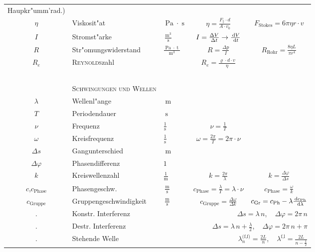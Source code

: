 \begin{landscape}
\begin{longtable}{c l l c c}
{  Haupkr"umm'rad.)}\\
%
$\eta$ & Viskosit"at & $\operatorname{Pa}\cdot\operatorname{s}$ & $\eta
= \frac{F_\| \cdot d}{A \cdot v_0}$ & $F_\text{Stokes} = 6\pi \eta
r \cdot v$\\
$I$ & Stromst"arke & $\frac{\operatorname{m}^3}{\operatorname{s}}$ & $I
= \frac{\Delta V}{\Delta t} \to \frac{\, \mathrm{d} V}{\, \mathrm{d} t}$\\
$R$ & Str"omungswiderstand & $\frac{\operatorname{Pa}\cdot
  \operatorname{t}}{\operatorname{m}^3}$ & $R = \frac{\Delta p}{I}$ &
$R_\text{Rohr} = \frac{8 \eta L}{\pi r^4}$\\
%
$R_e$ & \textsc{Reynolds}zahl & ~& $R_e = \frac{\varrho \cdot d \cdot
  v}{\eta}$\\
%
\hline
~ \\
%
%
%
~ & \textsc{Schwingungen und Wellen}\\
$\lambda$ & Wellenl"ange & $\operatorname{m}$ \\
$T$ & Periodendauer & $\operatorname{s}$\\
$\nu$ & Frequenz & $\frac{1}{\operatorname{s}}$ & $\nu =
\frac{1}{T}$\\
$\omega$ & Kreisfrequenz & $\frac{1}{\operatorname{s}}$ & $\omega =
\frac{2\pi}{T} = 2\pi \cdot \nu$\\
$\Delta s$ & Gangunterschied & $\operatorname{m}$\\
$\Delta \varphi$ & Phasendifferenz & $1$\\
$k$ & Kreiswellenzahl & $\frac{1}{\operatorname{m}}$ & $k =
\frac{2\pi}{\lambda}$ & $k = \frac{\Delta \varphi}{\Delta s}$\\
$c$,$c_\text{Phase}$ & Phasengeschw. &
$\frac{\operatorname{m}}{\operatorname{s}}$ & $c_\text{Phase} =
\frac{\lambda}{T} = \lambda \cdot \nu$ & $c_\text{Phase} =
\frac{\omega}{k}$\\
$c_\text{Gruppe}$ & Gruppengeschwindigkeit &
$\frac{\operatorname{m}}{\operatorname{s}}$ & $c_\text{Gruppe} =
\frac{\Delta \omega}{\Delta k}$ & $c_\text{Gr} = c_\text{Ph} - \lambda
\frac{\, \mathrm{d} c_\text{Ph}}{\, \mathrm{d} \lambda }$\\
. & Konstr. Interferenz & \multicolumn{3}{r}{$\Delta s = \lambda \, n$,
  ~ $\Delta \varphi = 2\pi\, n$}\\
. & Destr. Interferenz & \multicolumn{3}{r}{$\Delta s = \lambda \, n +
  \frac{\lambda}{2}$,
  ~ $\Delta \varphi = 2\pi\, n + \pi$}\\
. & Stehende Welle & \multicolumn{3}{r}{$\lambda^\text{(f,f)}_n =
  \frac{2L}{n}$, ~ $\lambda^\text{f,l} = \frac{2L}{n - \frac{1}{2}}$}\\

\end{longtable}
\end{landscape}
